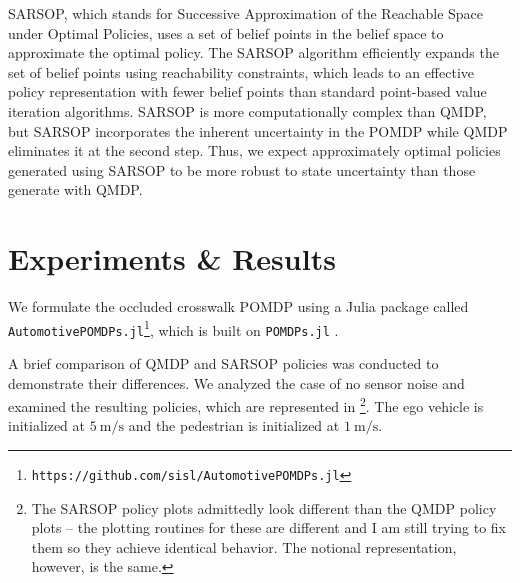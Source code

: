 \documentclass[conference]{IEEEtran}
\begin{document}
SARSOP, which stands for Successive Approximation of the Reachable Space under Optimal Policies, uses a set of belief points in the belief space to approximate the optimal policy. The SARSOP algorithm efficiently expands the set of belief points using reachability constraints, which leads to an effective policy representation with fewer belief points than standard point-based value iteration algorithms. SARSOP is more computationally complex than QMDP, but SARSOP incorporates the inherent uncertainty in the POMDP while QMDP eliminates it at the second step. Thus, we expect approximately optimal policies generated using SARSOP to be more robust to state uncertainty than those generate with QMDP.


\section{Experiments \& Results}
\label{sec:experiments-results}

We formulate the occluded crosswalk POMDP using a Julia package called \texttt{AutomotivePOMDPs.jl}\footnote{\texttt{https://github.com/sisl/AutomotivePOMDPs.jl}}, which is built on \texttt{POMDPs.jl} \cite{Egorov2017POMDPs.jl:Uncertainty}.

A brief comparison of QMDP and SARSOP policies was conducted to demonstrate their differences. We analyzed the case of no sensor noise and examined the resulting policies, which are represented in \footnote{The SARSOP policy plots admittedly look different than the QMDP policy plots -- the plotting routines for these are different and I am still trying to fix them so they achieve identical behavior. The notional representation, however, is the same.}. The ego vehicle is initialized at $5 ~\si{\meter\per\second}$ and the pedestrian is initialized at $1 ~\si{\meter\per\second}$.
\end{document}
